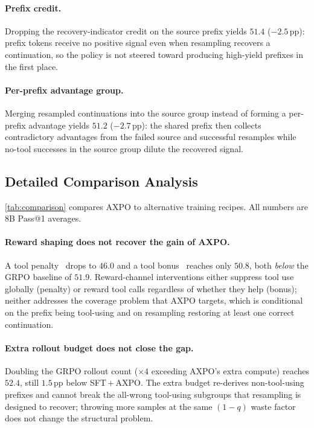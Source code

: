 \paragraph{Prefix credit.}
Dropping the recovery-indicator credit on the source prefix yields $51.4$ ($-2.5$\,pp): prefix tokens receive no positive signal even when resampling recovers a continuation, so the policy is not steered toward producing high-yield prefixes in the first place.

\paragraph{Per-prefix advantage group.}
Merging resampled continuations into the source group instead of forming a per-prefix advantage yields $51.2$ ($-2.7$\,pp): the shared prefix then collects contradictory advantages from the failed source and successful resamples while no-tool successes in the source group dilute the recovered signal.

\subsection{Detailed Comparison Analysis}
\label{app:comparison-details}

\autoref{tab:comparison} compares AXPO to alternative training recipes. All numbers are 8B Pass@1 averages.

\paragraph{Reward shaping does not recover the gain of AXPO.}
A tool penalty~\citep{otc} drops to $46.0$ and a tool bonus~\citep{pyvision-rl, pixelreasoner, deepeyes} reaches only $50.8$, both \emph{below} the GRPO baseline of $51.9$. Reward-channel interventions either suppress tool use globally (penalty) or reward tool calls regardless of whether they help (bonus); neither addresses the coverage problem that AXPO targets, which is conditional on the prefix being tool-using and on resampling restoring at least one correct continuation.

\paragraph{Extra rollout budget does not close the gap.}
Doubling the GRPO rollout count ($\times 4$ exceeding AXPO's extra compute) reaches $52.4$, still $1.5$\,pp below SFT\,+\,AXPO. The extra budget re-derives non-tool-using prefixes and cannot break the all-wrong tool-using subgroups that resampling is designed to recover; throwing more samples at the same $(1{-}q)$ waste factor does not change the structural problem.

